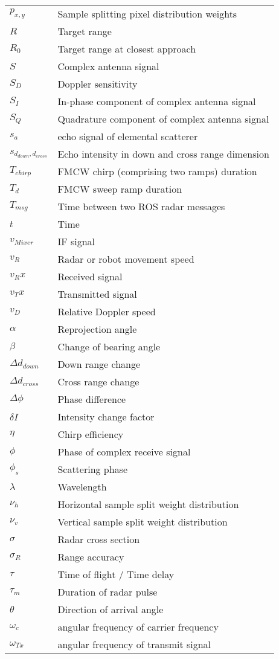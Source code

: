 \begin{listofsymbols}
\begin{tabularx}{\textwidth}{%
  >{\setlength{\hsize}{3cm}\raggedright\arraybackslash}X%
  X%
}
$p_{x,y}$ & Sample splitting pixel distribution weights \\
$R$   & Target range \\
$R_0$ & Target range at closest approach \\
$S$   & Complex antenna signal \\
$S_D$ & Doppler sensitivity \\
$S_I$ & In-phase component of complex antenna signal \\
$S_Q$ & Quadrature component of complex antenna signal \\
$s_a$ & echo signal of elemental scatterer \\
$s_{d_{down},d_{cross}}$ & Echo intensity in down and cross range dimension \\
$T_{chirp}$ & FMCW chirp (comprising two ramps) duration \\
$T_d$ & FMCW sweep ramp duration \\
$T_{msg}$ & Time between two ROS radar messages \\
$t$ & Time \\
$v_{Mixer}$ & IF signal \\
$v_R$ & Radar or robot movement speed \\
$v_Rx$ & Received signal \\
$v_Tx$ & Transmitted signal \\
$v_D$ & Relative Doppler speed \\
$\alpha$ & Reprojection angle \\
$\beta$ & Change of bearing angle \\
$\Delta d_{down}$ & Down range change \\
$\Delta d_{cross}$ & Cross range change \\
$\Delta\phi$ & Phase difference \\
$\delta I$ & Intensity change factor \\
$\eta$ & Chirp efficiency \\
$\phi$ & Phase of complex receive signal \\
$\phi_s$ & Scattering phase \\
$\lambda$ & Wavelength \\
$\nu_h$ & Horizontal sample split weight distribution \\
$\nu_v$ & Vertical sample split weight distribution \\
$\sigma$ & Radar cross section \\
$\sigma_R$ & Range accuracy \\
$\tau$ & Time of flight / Time delay \\
$\tau_m$ & Duration of radar pulse \\
$\theta$ & Direction of arrival angle \\
$\omega_c$ & angular frequency of carrier frequency \\
$\omega_{Tx}$ & angular frequency of transmit signal \\

\end{tabularx}


\end{listofsymbols}
